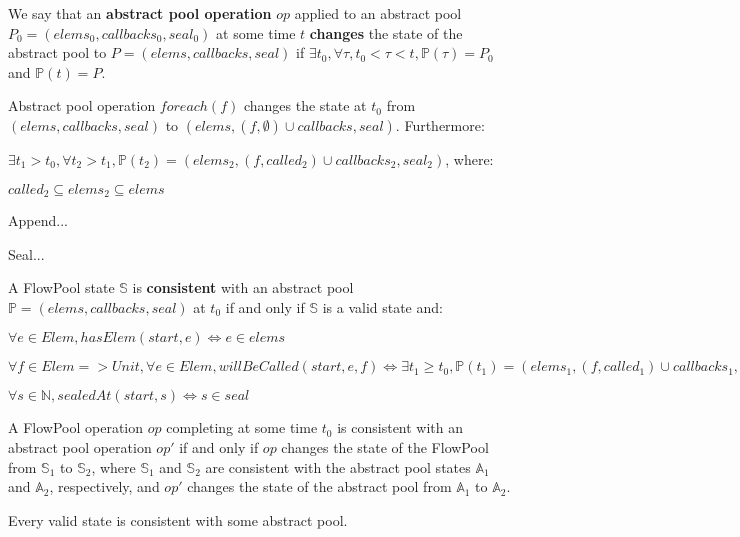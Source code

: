 \documentclass[runningheads,a4paper]{llncs}
\begin{document}
\begin{definition}
We say that an \textbf{abstract pool operation} $op$ applied to an abstract pool $P_0 = (elems_0, callbacks_0, seal_0)$ 
at some time $t$ \textbf{changes} the state of the abstract pool to $P = (elems, callbacks, seal)$ 
if $\exists t_0, \forall \tau, t_0 < \tau < t, \mathbb{P}(\tau) = P_0$ and $\mathbb{P}(t) = P$.

Abstract pool operation $foreach(f)$ changes the state at $t_0$ from $(elems, callbacks, seal)$ 
to $(elems, (f, \emptyset) \cup callbacks, seal)$. Furthermore:

$\exists t_1 > t_0, \forall t_2 > t_1, \mathbb{P}(t_2) = (elems_2, (f, called_2) \cup callbacks_2, seal_2)$, where:

$called_2 \subseteq elems_2 \subseteq elems$

Append...

Seal...

\end{definition}


\begin{definition}[Consistency]
A FlowPool state $\mathbb{S}$ is \textbf{consistent} with an abstract pool 
$\mathbb{P} = (elems, callbacks, seal)$ at $t_0$ if and only if $\mathbb{S}$ 
is a valid state and:
\begin{description}
\item $\forall e \in Elem, hasElem(start, e) \Leftrightarrow e \in elems$
\item $\forall f \in Elem => Unit, \forall e \in Elem, willBeCalled(start, e, f) \Leftrightarrow \exists t_1 \geq t_0, \mathbb{P}(t_1) = (elems_1, (f, called_1) \cup callbacks_1, seal_1), elems \subseteq called_1$
\item $\forall s \in \mathbb{N}, sealedAt(start, s) \Leftrightarrow s \in seal$
\end{description}

A FlowPool operation $op$ completing at some time $t_0$ is consistent with an abstract pool operation $op'$ if 
and only if $op$ changes the state of the FlowPool from $\mathbb{S}_1$ to $\mathbb{S}_2$, where $\mathbb{S}_1$ 
and $\mathbb{S}_2$ are consistent with the abstract pool states $\mathbb{A}_1$ and $\mathbb{A}_2$, respectively, 
and $op'$ changes the state of the abstract pool from $\mathbb{A}_1$ to $\mathbb{A}_2$.
\end{definition}


\begin{proposition}
Every valid state is consistent with some abstract pool.
\end{proposition}
\end{document}
